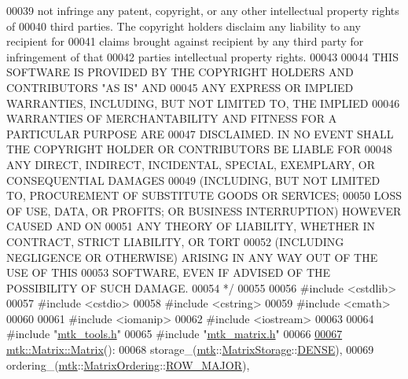 \begin{DoxyCode}
00039 \textcolor{comment}{not infringe any patent, copyright, or any other intellectual property rights of}
00040 \textcolor{comment}{third parties. The copyright holders disclaim any liability to any recipient for}
00041 \textcolor{comment}{claims brought against recipient by any third party for infringement of that}
00042 \textcolor{comment}{parties intellectual property rights.}
00043 \textcolor{comment}{}
00044 \textcolor{comment}{THIS SOFTWARE IS PROVIDED BY THE COPYRIGHT HOLDERS AND CONTRIBUTORS "AS IS" AND}
00045 \textcolor{comment}{ANY EXPRESS OR IMPLIED WARRANTIES, INCLUDING, BUT NOT LIMITED TO, THE IMPLIED}
00046 \textcolor{comment}{WARRANTIES OF MERCHANTABILITY AND FITNESS FOR A PARTICULAR PURPOSE ARE}
00047 \textcolor{comment}{DISCLAIMED. IN NO EVENT SHALL THE COPYRIGHT HOLDER OR CONTRIBUTORS BE LIABLE FOR}
00048 \textcolor{comment}{ANY DIRECT, INDIRECT, INCIDENTAL, SPECIAL, EXEMPLARY, OR CONSEQUENTIAL DAMAGES}
00049 \textcolor{comment}{(INCLUDING, BUT NOT LIMITED TO, PROCUREMENT OF SUBSTITUTE GOODS OR SERVICES;}
00050 \textcolor{comment}{LOSS OF USE, DATA, OR PROFITS; OR BUSINESS INTERRUPTION) HOWEVER CAUSED AND ON}
00051 \textcolor{comment}{ANY THEORY OF LIABILITY, WHETHER IN CONTRACT, STRICT LIABILITY, OR TORT}
00052 \textcolor{comment}{(INCLUDING NEGLIGENCE OR OTHERWISE) ARISING IN ANY WAY OUT OF THE USE OF THIS}
00053 \textcolor{comment}{SOFTWARE, EVEN IF ADVISED OF THE POSSIBILITY OF SUCH DAMAGE.}
00054 \textcolor{comment}{*/}
00055 
00056 \textcolor{preprocessor}{#include <cstdlib>}
00057 \textcolor{preprocessor}{#include <cstdio>}
00058 \textcolor{preprocessor}{#include <cstring>}
00059 \textcolor{preprocessor}{#include <cmath>}
00060 
00061 \textcolor{preprocessor}{#include <iomanip>}
00062 \textcolor{preprocessor}{#include <iostream>}
00063 
00064 \textcolor{preprocessor}{#include "\hyperlink{mtk__tools_8h}{mtk\_tools.h}"}
00065 \textcolor{preprocessor}{#include "\hyperlink{mtk__matrix_8h}{mtk\_matrix.h}"}
00066 
\hypertarget{mtk__matrix_8cc_source_l00067}{}\hyperlink{classmtk_1_1Matrix_a04b8575764d3a649f21950c794f4cc02}{00067} \hyperlink{classmtk_1_1Matrix_a04b8575764d3a649f21950c794f4cc02}{mtk::Matrix::Matrix}():
00068   storage\_(\hyperlink{namespacemtk}{mtk}::\hyperlink{group__c02-enums_ga25b67ec6a2afeee69f9bb196a9c66619}{MatrixStorage}::\hyperlink{namespacemtk_ga25b67ec6a2afeee69f9bb196a9c66619a0706fbbd929bd8abc4de386c53d439ff}{DENSE}),
00069   ordering\_(\hyperlink{namespacemtk}{mtk}::\hyperlink{group__c02-enums_ga622801bd9f912d0f976c3e383f5f581c}{MatrixOrdering}::\hyperlink{namespacemtk_ga622801bd9f912d0f976c3e383f5f581ca21541962976d7709c26e9cd8385bd648}{ROW\_MAJOR}),

\end{DoxyCode}
